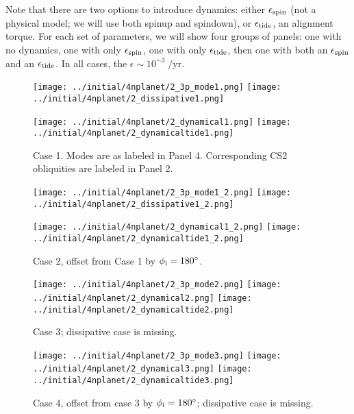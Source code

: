 \documentclass[11pt,
        usenames, %
        dvipsnames %
    ]{article}
\begin{document}
Note that there are two options to introduce dynamics: either $\epsilon_{\rm
spin}$ (not a physical model; we will use both spinup and spindown), or
$\epsilon_{\rm tide}$, an alignment torque. For each set of parameters, we will
show four groups of panels: one with no dynamics, one with only $\epsilon_{\rm
spin}$, one with only $\epsilon_{\rm tide}$, then one with both an
$\epsilon_{\rm spin}$ and an $\epsilon_{\rm tide}$. In all cases, the $\epsilon
\sim 10^{-3}\;\mathrm{/yr}$.
\begin{figure}
    \centering
    \texttt{[image: ../initial/4nplanet/2\_3p\_mode1.png]}
    \texttt{[image: ../initial/4nplanet/2\_dissipative1.png]}

    \texttt{[image: ../initial/4nplanet/2\_dynamical1.png]}
    \texttt{[image: ../initial/4nplanet/2\_dynamicaltide1.png]}
    \caption{Case 1. Modes are as labeled in Panel 4. Corresponding CS2
    obliquities are labeled in Panel 2.}\label{fig:1}
\end{figure}
\begin{figure}
    \centering
    \texttt{[image: ../initial/4nplanet/2\_3p\_mode1\_2.png]}
    \texttt{[image: ../initial/4nplanet/2\_dissipative1\_2.png]}

    \texttt{[image: ../initial/4nplanet/2\_dynamical1\_2.png]}
    \texttt{[image: ../initial/4nplanet/2\_dynamicaltide1\_2.png]}
    \caption{Case 2, offset from Case 1 by $\phi_{\rm i} = 180^\circ$.}\label{fig:2}
\end{figure}
\begin{figure}
    \centering
    \texttt{[image: ../initial/4nplanet/2\_3p\_mode2.png]}
    \texttt{[image: ../initial/4nplanet/2\_dynamical2.png]}
    \texttt{[image: ../initial/4nplanet/2\_dynamicaltide2.png]}
    \caption{Case 3; dissipative case is missing.}\label{fig:5}
\end{figure}
\begin{figure}
    \centering
    \texttt{[image: ../initial/4nplanet/2\_3p\_mode3.png]}
    \texttt{[image: ../initial/4nplanet/2\_dynamical3.png]}
    \texttt{[image: ../initial/4nplanet/2\_dynamicaltide3.png]}
    \caption{Case 4, offset from case 3 by $\phi_{\rm i} = 180^\circ$;
    dissipative case is missing.}\label{fig:6}
\end{figure}
\end{document}

